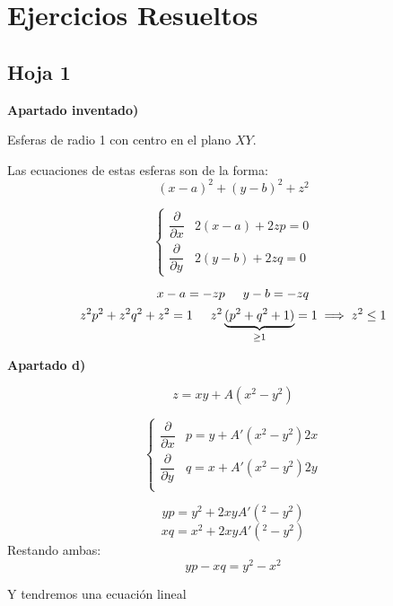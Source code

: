 \documentclass[openany]{book}
\begin{document}
\chapter{Ejercicios Resueltos}
\section{Hoja 1}
\setcounter{ex}{1}
\begin{exercise}

  \begin{flushright}
    \textbf{Apartado inventado)}
  \end{flushright}

  Esferas de radio 1 con centro en el plano $ XY $.

  Las ecuaciones de estas esferas son de la forma:
  $$ (x-a)^2+(y-b)^2+z^2 $$

  $$ \left\{
  \begin{array}{ll}
    \dfrac{\partial }{\partial x} & 2(x-a)+2zp = 0\\ 
    \dfrac{\partial }{\partial y} & 2(y-b) + 2zq = 0
  \end{array}
  \right. $$

  $$ x-a = -zp \hspace{5mm} y-b = -zq $$
  $$  z^2p^2+z^2q^2+z^2=1 \hspace{5mm} z^2\underbrace{(p^2+q^2+1)}_{\geq  1} = 1 \implies z^2 \leq  1$$

  \begin{flushright}
    \textbf{Apartado d)}
  \end{flushright}

  $$ z = xy+A(x^2-y^2) $$
  
  $$ \left\{
  \begin{array}{ll}
    \dfrac{\partial }{\partial x} & p = y+A'(x^2-y^2)2x\\ 
    \dfrac{\partial }{\partial y} & q = x + A'(x^2-y^2)2y\\ 
  \end{array}
  \right. $$

  $$ yp = y^2+2xyA'(^2-y^2) $$
  $$ xq = x^2+2xyA'(^2-y^2) $$
  Restando ambas:
  $$ yp - xq = y^2-x^2 $$

  Y tendremos una ecuación lineal

\end{exercise}

\setcounter{ex}{8}
\end{document}
